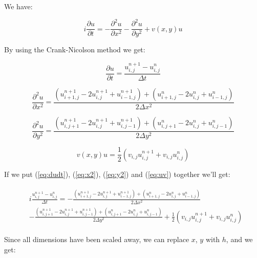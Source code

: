\documentclass[english,notitlepage,reprint,nofootinbib]{revtex4-1}  %
\begin{document}
\onecolumngrid

We have:   

\begin{equation}
    i \frac{\partial u}{\partial t} = - \frac{\partial^2 u}{\partial x^2} - \frac{\partial^2 u}{\partial y^2} + v(x,y)u
\end{equation}

By using the Crank-Nicolson method we get:

\begin{equation} \label{eq:dudt}
    \frac{\partial u}{\partial t} = \frac{u_{i,j}^{n+1} - u_{i,j}^n}{\Delta t}
\end{equation} 

\begin{equation} \label{eq:x2}
    \frac{\partial^2 u}{\partial x^2} = \frac{ \left( u_{i+1, j}^{n+1} - 2u_{i, j}^{n+1} + u_{i-1, j}^{n+1} \right) + \left( u_{i+1, j}^{n} - 2u_{i, j}^{n} + u_{i-1, j}^{n} \right) }{2 \Delta x^2}
\end{equation}

\begin{equation} \label{eq:y2}
    \frac{\partial^2 u}{\partial y^2} = \frac{ \left( u_{i, j+1}^{n+1} - 2u_{i, j}^{n+1} + u_{i, j-1}^{n+1} \right) + \left( u_{i, j+1}^{n} - 2u_{i, j}^{n} + u_{i, j-1}^{n} \right) }{2 \Delta y^2}
\end{equation}

\begin{equation} \label{eq:uv}
    v(x,y)u = \frac{1}{2} \left(v_{i,j} u_{i,j}^{n+1} + v_{i,j} u_{i,j}^n\right)
\end{equation}

If we put (\ref{eq:dudt}), (\ref{eq:x2}), (\ref{eq:y2}) and (\ref{eq:uv}) together we'll get:

\begin{align} \label{eq:step1}
\begin{split}
    &i \frac{u_{i,j}^{n+1} - u_{i,j}^n}{\Delta t} = - \frac{ \left( u_{i+1, j}^{n+1} - 2u_{i, j}^{n+1} + u_{i-1, j}^{n+1} \right) + \left( u_{i+1, j}^{n} - 2u_{i, j}^{n} + u_{i-1, j}^{n} \right) }{2 \Delta x^2} \\ 
    &- \frac{ \left( u_{i, j+1}^{n+1} - 2u_{i, j}^{n+1} + u_{i, j-1}^{n+1} \right) + \left( u_{i, j+1}^{n} - 2u_{i, j}^{n} + u_{i, j-1}^{n} \right) }{2 \Delta y^2} + \frac{1}{2} \left(v_{i,j} u_{i,j}^{n+1} + v_{i,j} u_{i,j}^n\right)
\end{split}
\end{align}

Since all dimensions have been scaled away, we can replace $x$, $y$ with $h$, and we get:
\end{document}
